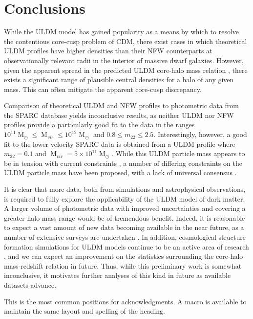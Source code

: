 \documentclass[a4paper,11pt]{article}
\begin{document}
\section{Conclusions}

While the ULDM model has gained popularity as a means by which to resolve the contentious core-cusp problem of CDM, there exist cases in which theoretical ULDM profiles have higher densities than their NFW counterparts at observationally relevant radii in the interior of massive dwarf galaxies. However, given the apparent spread in the predicted ULDM core-halo mass relation \cite{Schive:2014hza}, there exists a significant range of plausible central densities for a halo of any given mass. This can often mitigate the apparent core-cusp discrepancy. 

Comparison of theoretical ULDM and NFW profiles to photometric data from the SPARC database yields inconclusive results, as neither ULDM nor NFW profiles provide a particularly good fit to the data in the ranges $10^{11}\operatorname{M}_{\odot}\leq \operatorname{M}_{vir} \leq 10^{12}\operatorname{M}_{\odot}$ and $0.8 \leq m_{22} \leq 2.5$. Interestingly, however, a good fit to the lower velocity SPARC data is obtained from a ULDM profile where $m_{22} = 0.1$ and $\operatorname{M}_{vir} = 5\times 10^{11}\operatorname{M}_{\odot}$. While this ULDM particle mass appears to be in tension with current constraints \cite{Amendola:2005ad, Bozek:2014uqa}, a number of differing constraints on the ULDM particle mass have been proposed, with a lack of universal consensus \cite{Armengaud:2017nkf}.

It is clear that more data, both from simulations and astrophysical observations, is required to fully explore the applicability of the ULDM model of dark matter. A larger volume of photometric data with improved uncertainties and covering a greater halo mass range would be of tremendous benefit. Indeed, it is reasonable to expect a vast amount of new data becoming available in the near future, as a number of extensive surveys are undertaken \cite{Simon:2019kmm}. In addition, cosmological structure formation simulations for ULDM models continue to be an active area of research \cite{Lin:2018whl, Clough:2018exo, Mocz:2015sda}, and we can expect an improvement on the statistics surrounding the core-halo mass-redshift relation in future. Thus, while this preliminary work is somewhat inconclusive, it motivates further analyses of this kind in future as available datasets advance. 




\acknowledgments

This is the most common positions for acknowledgments. A macro is
available to maintain the same layout and spelling of the heading.






 
\end{document}
